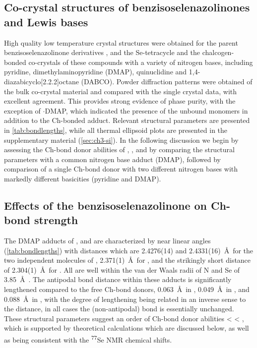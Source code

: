 \begin{refsection}
    \subsection{Co-crystal structures of benzisoselenazolinones and Lewis bases}
    High quality low temperature crystal structures were obtained for the parent benzisoselenazolinone derivatives  \autocite{Thomas2015},  and the Se-tetracycle  and the chalcogen-bonded co-crystals of these compounds with a variety of nitrogen bases, including pyridine, dimethylaminopyridine (DMAP), quinuclidine and 1,4-diaza\-bicyclo[2.2.2]\-octane (DABCO).
    Powder diffraction patterns were obtained of the bulk co-crystal material and compared with the single crystal data, with excellent agreement.
    This provides strong evidence of phase purity, with the exception of $ \cdot $DMAP, which indicated the presence of the unbound monomers in addition to the Ch-bonded adduct.
    Relevant structural parameters are presented in \cref{tab:bondlengths}, while all thermal ellipsoid plots are presented in the supplementary material (\cref{sec:ch3-si}).
    In the following discussion we begin by assessing the Ch-bond donor abilities of , , and  by comparing the structural parameters with a common nitrogen base adduct (DMAP), followed by comparison of a single Ch-bond donor  with two different nitrogen bases with markedly different basicities (pyridine and DMAP).
    
    \subsection{Effects of the benzisoselenazolinone on Ch-bond strength}
    The DMAP adducts of ,  and  are characterized by near linear  angles (\cref{tab:bondlengths}) with distances which are 2.4276(14) and 2.4331(16)~\AA\ for the two independent molecules of , 2.371(1)~\AA\ for , and the strikingly short  distance of 2.304(1)~\AA\ for .
    All are well within the van der Waals radii of N and Se of 3.85~\AA\ \autocite{Batsanov2001}.
    The antipodal  bond distance within these adducts is significantly lengthened compared to the free Ch-bond donors, 0.063~\AA\ in , 0.049~\AA\ in , and 0.088~\AA\ in , with the degree of lengthening being related in an inverse sense to the distance, in all cases the (non-antipodal)  bond is essentially unchanged.
    These structural parameters suggest an order of Ch-bond donor abilities  <  < , which is supported by theoretical calculations which are discussed below, as well as being consistent with the \textsuperscript{77}Se NMR chemical shifts.
    

\end{refsection}
